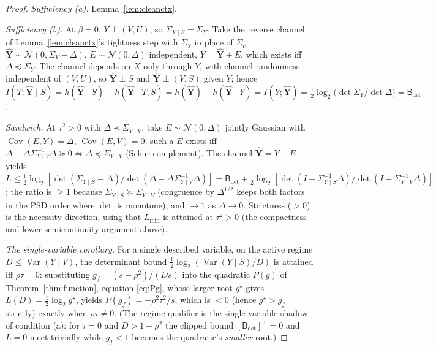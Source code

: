 ﻿\documentclass[11pt,onecolumn]{IEEEtran}
\newcommand{\Cov}{\operatorname{Cov}}
\newcommand{\Bdet}{\mathsf{B}_{\det}}
\begin{document}
\begin{proof}
\emph{Sufficiency (a).} Lemma~\ref{lem:cleanctx}.

\emph{Sufficiency (b).} At $\beta=0$, $Y\perp(V,U)$, so
$\Sigma_{Y\mid S}=\Sigma_Y$. Take the reverse channel of
Lemma~\ref{lem:cleanctx}'s tightness step with $\Sigma_Y$ in place of
$\Sigma_c$: $\hat{\mathbf Y}\sim\mathcal N(0,\Sigma_Y-\Delta)$,
$E\sim\mathcal N(0,\Delta)$ independent, $Y=\hat{\mathbf Y}+E$, which
exists iff $\Delta\preceq\Sigma_Y$. The channel depends on $X$ only
through $Y$, with channel randomness independent of $(V,U)$, so
$\hat{\mathbf Y}\perp S$ and $\hat{\mathbf Y}\perp(V,S)$ given $Y$;
hence
$I(T;\hat{\mathbf Y}\mid S)=h(\hat{\mathbf Y}\mid S)-h(\hat{\mathbf
Y}\mid T,S)=h(\hat{\mathbf Y})-h(\hat{\mathbf Y}\mid Y)
=I(Y;\hat{\mathbf Y})=\tfrac12\log_2\bigl(\det\Sigma_Y/\det\Delta\bigr)
=\Bdet$ \cite{xiaoluo2005,chen2026}.

\emph{Sandwich.} At $\tau^2>0$ with $\Delta\prec\Sigma_{Y\mid V}$, take
$E\sim\mathcal N(0,\Delta)$ jointly Gaussian with
$\Cov(E,Y)=\Delta$, $\Cov(E,V)=0$; such a $E$ exists iff
$\Delta-\Delta\Sigma_{Y\mid V}^{-1}\Delta\succeq0
\Leftrightarrow\Delta\preceq\Sigma_{Y\mid V}$ (Schur complement). The
channel $\hat{\mathbf Y}=Y-E$ yields
$L\le\tfrac12\log_2[\det(\Sigma_{Y\mid S}-\Delta)/\det(\Delta-
\Delta\Sigma_{Y\mid V}^{-1}\Delta)]=\Bdet
+\tfrac12\log_2[\det(I-\Sigma_{Y\mid S}^{-1}\Delta)/\det(I-
\Sigma_{Y\mid V}^{-1}\Delta)]$; the ratio is $\ge1$ because
$\Sigma_{Y\mid S}\succeq\Sigma_{Y\mid V}$ (congruence by $\Delta^{1/2}$
keeps both factors in the PSD order where $\det$ is monotone), and $\to1$
as $\Delta\to0$. Strictness ($>0$) is the necessity direction, using
that $L_{\min}$ is attained at $\tau^2>0$ (the compactness and
lower-semicontinuity argument above).

\emph{The single-variable corollary.} For a single described variable,
on the active regime $D\le\operatorname{Var}(Y\mid V)$, the determinant
bound $\tfrac12\log_2(\operatorname{Var}(Y\mid S)/D)$ is attained iff
$\rho\tau=0$: substituting $g_f=(s-\rho^2)/(Ds)$ into the quadratic
$P(g)$ of Theorem~\ref{thm:function}, equation \eqref{eq:Pg}, whose
larger root $g^\star$ gives $L(D)=\tfrac12\log_2 g^\star$, yields
$P(g_f)=-\rho^2\tau^2/s$, which is $<0$ (hence $g^\star>g_f$ strictly)
exactly when $\rho\tau\ne0$. (The regime qualifier is the single-variable
shadow of condition (a): for $\tau=0$ and $D>1-\rho^2$ the clipped bound
$[\Bdet]^{+}=0$ and $L=0$ meet trivially while $g_f<1$ becomes the
quadratic's \emph{smaller} root.)
\end{proof}
\end{document}
